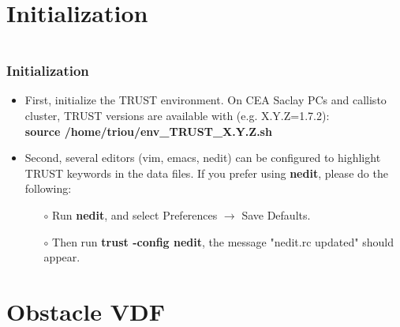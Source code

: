 \documentclass[10pt]{beamer}
\begin{document}
\section{Initialization}
\begin{frame}
\begin{columns}[c] 
\tableofcontents[sections={1-7},currentsection, currentsubsection]
\tableofcontents[sections={8-13},currentsection, currentsubsection]
\end{columns}
\end{frame}
\begin{frame}
\frametitle{Initialization}
\begin{block}{}

\begin{itemize}
\item First, initialize the TRUST environment. On CEA Saclay PCs and callisto cluster, TRUST versions are available with (e.g. X.Y.Z=1.7.2):\\
\vspace{0.2cm}
\textbf{source  /home/triou/env\_TRUST\_X.Y.Z.sh}
\vspace{0.5cm}

\item Second, several editors (vim, emacs, nedit) can be configured to highlight TRUST keywords in the data files. If you prefer using \textbf{nedit}, please do the following:

    \begin{itemize}
    \item [$\circ$] Run \textbf{nedit}, and select Preferences $\rightarrow$ Save Defaults.
    \item [$\circ$] Then run \textbf{trust -config nedit}, the message "nedit.rc updated" should appear.
    \end{itemize}
\end{itemize}

\end{block}
\end{frame}



\section{Obstacle VDF}
\end{document}
